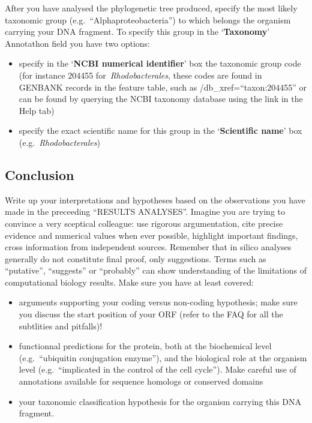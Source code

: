 \documentclass[
]{book}
\providecommand{\tightlist}{%
  \setlength{\itemsep}{0pt}\setlength{\parskip}{0pt}}
\begin{document}
After you have analysed the phylogenetic tree produced, specify the most likely taxonomic group (e.g.~``Alphaproteobacteria'') to which belongs the organism carrying your DNA fragment. To specify this group in the `\textbf{Taxonomy}' Annotathon field you have two options:

\begin{itemize}
\tightlist
\item
  specify in the `\textbf{NCBI numerical identifier}' box the taxonomic group code (for instance 204455 for~\emph{Rhodobacterales}, these codes are found in GENBANK records in the feature table, such as /db\_xref=``taxon:204455'' or can be found by querying the NCBI taxonomy database using the link in the Help tab)
\item
  specify the exact scientific name for this group in the `\textbf{Scientific name}' box (e.g.~\emph{Rhodobacterales})
\end{itemize}

\hypertarget{conclusion}{%
\subsection{Conclusion}\label{conclusion}}

Write up your interpretations and hypotheses based on the observations you have made in the preceeding ``RESULTS ANALYSES''. Imagine you are trying to convince a very sceptical colleague: use rigorous argumentation, cite precise evidence and numerical values when ever possible, highlight important findings, cross information from independent sources. Remember that in silico analyses generally do not constitute final proof, only suggestions. Terms such as ``putative'', ``suggests'' or ``probably'' can show understanding of the limitations of computational biology results.
Make sure you have at least covered:

\begin{itemize}
\tightlist
\item
  arguments supporting your coding versus non-coding hypothesis; make sure you discuss the start position of your ORF (refer to the FAQ for all the subtlities and pitfalls)!
\item
  functionnal predictions for the protein, both at the biochemical level (e.g.~``ubiquitin conjugation enzyme''), and the biological role at the organism level (e.g.~``implicated in the control of the cell cycle''). Make careful use of annotations available for sequence homologs or conserved domains
\item
  your taxonomic classification hypothesis for the organism carrying this DNA fragment.
\end{itemize}
\end{document}
